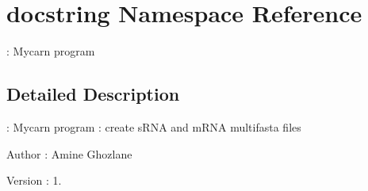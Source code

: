 \hypertarget{namespacedocstring}{
\section{docstring \-Namespace \-Reference}
\label{namespacedocstring}
}


\-: \-Mycarn program  




\subsection{\-Detailed \-Description}
\-: \-Mycarn program \-: create s\-R\-N\-A and m\-R\-N\-A multifasta files

\begin{DoxyAuthor}{\-Author}
\-: \-Amine \-Ghozlane 
\end{DoxyAuthor}
\begin{DoxyVersion}{\-Version}
\-: 1. 
\end{DoxyVersion}
